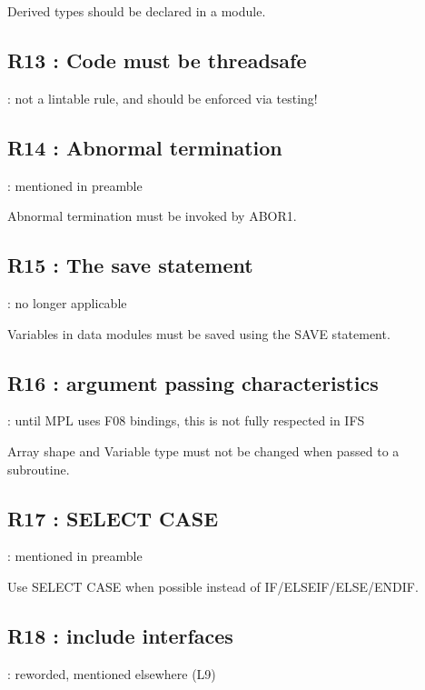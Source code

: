 \documentclass[letterpaper,10pt,english]{sphinxmanual}
\begin{document}
Derived types should be declared in a module.


\subsection{R13 :  Code must be threadsafe}
\label{\detokenize{obsolescent/r13:r13-code-must-be-threadsafe}}\label{\detokenize{obsolescent/r13::doc}}
 : not a lintable rule, and should be enforced via testing!


\subsection{R14 :  Abnormal termination}
\label{\detokenize{obsolescent/r14:r14-abnormal-termination}}\label{\detokenize{obsolescent/r14::doc}}
 : mentioned in preamble

Abnormal termination must be invoked by ABOR1.


\subsection{R15 :  The save statement}
\label{\detokenize{obsolescent/r15:r15-the-save-statement}}\label{\detokenize{obsolescent/r15::doc}}
 : no longer applicable

Variables in data modules must be saved using the SAVE statement.


\subsection{R16 : argument passing characteristics}
\label{\detokenize{obsolescent/r16:r16-argument-passing-characteristics}}\label{\detokenize{obsolescent/r16::doc}}
 : until MPL uses F08 bindings, this is not fully respected in IFS

Array shape and Variable type must not be changed when passed to a subroutine.


\subsection{R17 :  SELECT CASE}
\label{\detokenize{obsolescent/r17:r17-select-case}}\label{\detokenize{obsolescent/r17::doc}}
 : mentioned in preamble

Use SELECT CASE when possible instead of IF/ELSEIF/ELSE/ENDIF.


\subsection{R18 : include interfaces}
\label{\detokenize{obsolescent/r18:r18-include-interfaces}}\label{\detokenize{obsolescent/r18::doc}}
 : reworded, mentioned elsewhere (L9)
\end{document}
